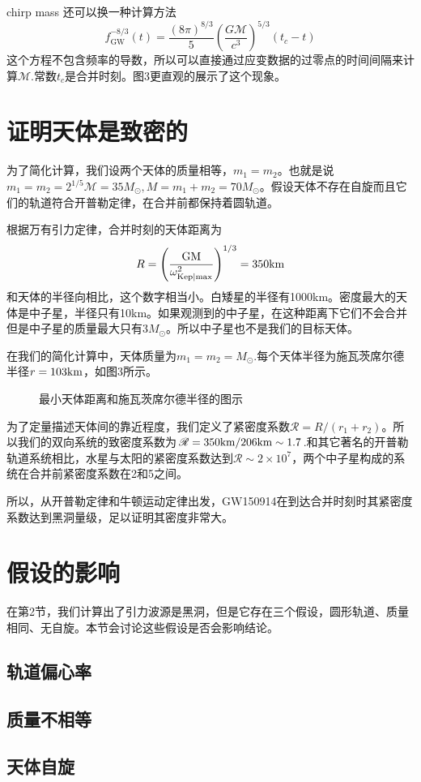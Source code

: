\documentclass[UTF8]{ctexart}
\begin{document}
chirp mass 还可以换一种计算方法
\begin{equation}
f_{\mathrm{GW}}^{-8 / 3}(t)=\frac{(8 \pi)^{8 / 3}}{5}\left(\frac{G \mathscr{M}}{c^{3}}\right)^{5 / 3}\left(t_{c}-t\right)
\end{equation}
这个方程不包含频率的导数，所以可以直接通过应变数据的过零点的时间间隔来计算$\mathscr{M}$.常数$t_c$是合并时刻。图3更直观的展示了这个现象。

\section{证明天体是致密的}
为了简化计算，我们设两个天体的质量相等，$m_1=m_2$。也就是说$m_1=m_2=2^{1/5}\mathscr{M}=35M_\odot,M=m_1+m_2=70M_\odot$。假设天体不存在自旋而且它们的轨道符合开普勒定律，在合并前都保持着圆轨道。

根据万有引力定律，合并时刻的天体距离为
\begin{equation}
R = \left(\frac{\rm GM}{\omega^2_{\rm Kep|max}}\right)^{1/3} = 350{\rm km}
\end{equation}
和天体的半径向相比，这个数字相当小。白矮星的半径有1000km。密度最大的天体是中子星，半径只有10km。如果观测到的中子星，在这种距离下它们不会合并但是中子星的质量最大只有$3M_\odot$。所以中子星也不是我们的目标天体。

在我们的简化计算中，天体质量为$m_1=m_2=M_\odot$.每个天体半径为施瓦茨席尔德半径$r = 103{\rm km}$，如图3所示。
\begin{figure}[!htbp]
	\centering
	\caption{最小天体距离和施瓦茨席尔德半径的图示}
\end{figure}

为了定量描述天体间的靠近程度，我们定义了紧密度系数$\mathscr{R}=R/(r_1+r_2)$。所以我们的双向系统的致密度系数为$\mathscr{R}=350{\rm km}/206{\rm km} \sim 1.7$.和其它著名的开普勒轨道系统相比，水星与太阳的紧密度系数达到$\mathscr{R}\sim 2\times 10^7$，两个中子星构成的系统在合并前紧密度系数在2和5之间。

所以，从开普勒定律和牛顿运动定律出发，GW150914在到达合并时刻时其紧密度系数达到黑洞量级，足以证明其密度非常大。

\section{假设的影响}
在第2节，我们计算出了引力波源是黑洞，但是它存在三个假设，圆形轨道、质量相同、无自旋。本节会讨论这些假设是否会影响结论。
\subsection{轨道偏心率}
\subsection{质量不相等}
\subsection{天体自旋}
\end{document}
